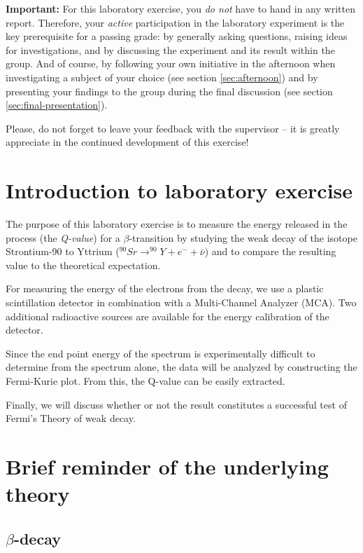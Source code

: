\documentclass[a4,11pt, notitlepage]{article}
\begin{document}
\textbf{Important: }For this laboratory exercise, you \emph{do not} have to hand in any
written report. Therefore, your \emph{active} participation in the laboratory experiment is
the key prerequisite for a passing grade: by generally asking questions,
raising ideas for investigations, and by discussing the experiment and
its result within the group. And of course, by following your own
initiative in the afternoon when investigating a subject of your
choice (see section \ref{sec:afternoon}) and by presenting your
findings to the group during the final discussion (see section
\ref{sec:final-presentation}).

Please, do not forget to leave your feedback with the supervisor -- it
is greatly appreciate in the continued development of this exercise!

\pagebreak
\section{Introduction to laboratory exercise}

The purpose of this laboratory exercise is to measure the energy
released in the process (the \textit{Q-value}) for a
$\beta$-transition by studying the weak decay of the isotope
Strontium-90 to Yttrium ($^{90}Sr\rightarrow ^{90}Y + e^- + \bar{\nu}$) and to compare the
resulting value to the theoretical expectation. 

For measuring the energy of the electrons from the decay, we use a
plastic scintillation detector in combination with a Multi-Channel
Analyzer (MCA). Two additional radioactive sources are available for
the energy calibration of the detector.

Since the end point energy of the spectrum is experimentally difficult
to determine from the spectrum alone, the data will be analyzed by
constructing the Fermi-Kurie plot. From this, the Q-value can be
easily extracted.

Finally, we will discuss whether or not the result constitutes a
successful test of Fermi's Theory of weak decay.

\section{Brief reminder of the underlying theory}
\subsection{$\beta$-decay}
\end{document}
